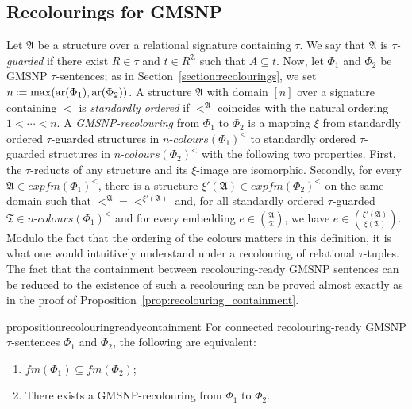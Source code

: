 \documentclass[oneside,reqno,12pt]{amsart}
\theoremstyle{plain}
\theoremstyle{remark}
\renewcommand{\coloneqq}{\mathrel{\mathop:}\mathrel{\mkern-1.2mu}=}
\newcommand{\struct}[1]{\mathfrak{#1}}
\newcommand{\fm}{\ensuremath{\mathit{fm}}\xspace}
\newcommand{\efm}{\ensuremath{\mathit{expfm}}\xspace}
\newcommand{\colours}{\ensuremath{n\text{-}\mathit{colours}}}
\newcommand{\ar}{\ensuremath{\mathrm{ar}}\xspace}
\begin{document}
{\subsection{Recolourings for GMSNP}
Let $\struct{A}$ be a structure over a relational signature containing $\tau$.
We say that $\struct{A}$ is \emph{$\tau$-guarded} if there exist $R\in \tau$ and $\bar{t}\in R^{\struct{A}}$ such that $A\subseteq \bar{t}$. 
Now, let $\Phi_1$ and $\Phi_2$ be GMSNP $\tau$-sentences; as in Section~\ref{section:recolourings}, we set $n\coloneqq \max(\ar(\Phi_1),\ar(\Phi_2))$.  
A structure $\struct{A}$ with domain $[n]$ over a signature containing $<$ is \emph{standardly ordered} if $<^{\struct{A}}$ coincides with the natural ordering $1<\cdots < n$.
A \emph{GMSNP-recolouring} from $\Phi_1$ to $\Phi_2$ is a mapping $\xi$ from standardly ordered  $\tau$-guarded structures in $\colours(\Phi_1)^{<}$ to standardly ordered $\tau$-guarded structures in $\colours(\Phi_2)^{<}$ with the following two properties.
First, the $\tau$-reducts of any structure and its $\xi$-image are isomorphic.
Secondly, for every $\struct A\in \efm(\Phi_1)^{<}$, there is a structure $\xi'(\struct A)\in \efm(\Phi_2)^{<}$ on the same domain such that ${<}^{\struct{A}}={<}^{\xi'(\struct A)}$ and, for all standardly ordered $\tau$-guarded $\struct{T} \in \colours(\Phi_1)^{<}$ and for every embedding $e\in \binom{\struct{A}}{\struct{T}}$, we have $e\in \binom{\xi'(\struct{A})}{\xi(\struct{T})}$.  
Modulo the fact that the ordering of the colours matters in this definition, it is what one would intuitively understand under a recolouring of relational $\tau$-tuples.
The fact that the containment between recolouring-ready GMSNP sentences can be reduced to the existence of such a recolouring can be proved almost exactly as in the proof of Proposition~\ref{prop:recolouring_containment}.
\begin{restatable}{proposition}{recolouringreadycontainment}   \label{prop:recolouring_ready_containment}
    For connected recolouring-ready GMSNP $\tau$-sentences $\Phi_1$ and $\Phi_2$, the following are equivalent:
\begin{enumerate}
        \item \label{item:recolouring_containment1} $\fm(\Phi_1)\subseteq \fm(\Phi_2)$;
        \item \label{item:recolouring_containment2} There exists a GMSNP-recolouring from $\Phi_1$ to $\Phi_2$. 
    \end{enumerate}   
\end{restatable}   

}
\end{document}
